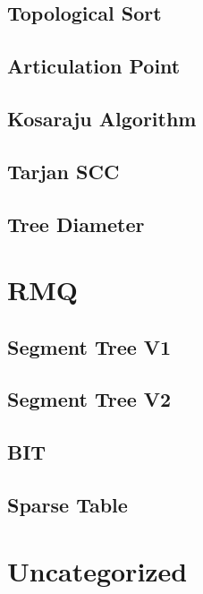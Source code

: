     \subsection{Topological Sort}
        
    \subsection{Articulation Point}
        
    \subsection{Kosaraju Algorithm}
        
    \subsection{Tarjan SCC}
        
    \subsection{Tree Diameter}
        


\section{RMQ}
    \subsection{Segment Tree V1}
        
    \subsection{Segment Tree V2}
        
    \subsection{BIT}
        
    \subsection{Sparse Table}
        


\section{Uncategorized}
